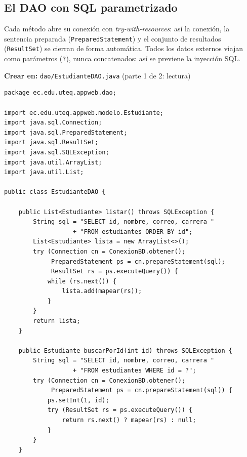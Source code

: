 \documentclass[11pt,a4paper,openany]{book}
\begin{document}
\subsection{El DAO con SQL parametrizado}
\label{ap:crud:jsp:dao}

Cada método abre su conexión con \emph{try-with-resources}: así la
conexión, la sentencia preparada (\texttt{Prepared\-Statement}) y el
conjunto de resultados (\texttt{Result\-Set}) se cierran de forma
automática. Todos los datos externos viajan como parámetros
(\texttt{?}), nunca concatenados: así se previene la inyección SQL.

{\small\textbf{Crear en:} \texttt{dao/EstudianteDAO.java} (parte 1 de 2: lectura)}
\begin{lstlisting}[style=java,caption={EstudianteDAO.java --- parte 1: listar y buscar},label={lst:jsp-dao-a}]
package ec.edu.uteq.appweb.dao;

import ec.edu.uteq.appweb.modelo.Estudiante;
import java.sql.Connection;
import java.sql.PreparedStatement;
import java.sql.ResultSet;
import java.sql.SQLException;
import java.util.ArrayList;
import java.util.List;

public class EstudianteDAO {

    public List<Estudiante> listar() throws SQLException {
        String sql = "SELECT id, nombre, correo, carrera "
                   + "FROM estudiantes ORDER BY id";
        List<Estudiante> lista = new ArrayList<>();
        try (Connection cn = ConexionBD.obtener();
             PreparedStatement ps = cn.prepareStatement(sql);
             ResultSet rs = ps.executeQuery()) {
            while (rs.next()) {
                lista.add(mapear(rs));
            }
        }
        return lista;
    }

    public Estudiante buscarPorId(int id) throws SQLException {
        String sql = "SELECT id, nombre, correo, carrera "
                   + "FROM estudiantes WHERE id = ?";
        try (Connection cn = ConexionBD.obtener();
             PreparedStatement ps = cn.prepareStatement(sql)) {
            ps.setInt(1, id);
            try (ResultSet rs = ps.executeQuery()) {
                return rs.next() ? mapear(rs) : null;
            }
        }
    }
\end{lstlisting}
\end{document}
